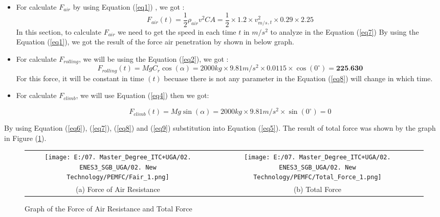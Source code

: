 \documentclass[12pt,a4paper]{article}
\numberwithin{equation}{section}
\begin{document}
	\begin{itemize}[label=-]
		\item For calculate $F_{air}$ by using Equation (\ref{eq1}) , we got :
			\begin{equation}




				F_{air}(t) = \frac{1}{2}\rho_{air}v^2CA = \frac{1}{2}\times1.2\times 	v^2_{m/s}_{,t}\times0.29\times 		2.25 \label{eq7}
			\end{equation}
			In this section, to calculate $F_{air}$ we need to get the speed in each time $t$ in $m/s^2$ to analyze in the Equation (\ref{eq7})
			By using the Equation (\ref{eq1}), we got the result of the force air penetration by shown in below graph.
		\item For calculate $F_{rolling}$, we will be using the Equation (\ref{eq2}), we got :
			\begin{equation}
				F_{rolling}(t) = MgC_r\cos(\alpha) = 2000kg\times9.81m/s^2\times0.0115\times\cos(0^\circ) = \textbf{225.630} \label{eq8}
			\end{equation}
			For this force, it will be constant in time $(t)$ becuase there is not any parameter in the Equation (\ref{eq8}) will change in which time.
			
			
		\item For calculate $F_{climb}$, we will use Equation (\ref{eq4}) then we got:
		
			\begin{equation}
				F_{climb}(t) = Mg\sin(\alpha) = 2000kg \times 9.81m/s^2 \times \sin(0^\circ) = 0 \label{eq9}
			\end{equation}		
	\end{itemize}

	By using Equation (\ref{eq6}), (\ref{eq7}), (\ref{eq8}) and (\ref{eq9}) substitution into Equation (\ref{eq5}). The result of total force was shown by the graph in Figure (\ref{4}).
	
	\begin{figure}[htbp]
		\centering
		\begin{tabular}{c @{\qquad} c}
			\texttt{[image: E:/07. Master\_Degree\_ITC+UGA/02. ENES3\_SGB\_UGA/02. New Technology/PEMFC/Fair\_1.png]} &
			\texttt{[image: E:/07. Master\_Degree\_ITC+UGA/02. ENES3\_SGB\_UGA/02. New Technology/PEMFC/Total\_Force\_1.png]} \\
			
			\small (a) Force of Air Resistance & \small (b) Total Force
		\end{tabular}
		
		\caption{\small Graph of the  Force of Air Resistance and Total Force}
		\label{4}
	\end{figure}
		
\end{document}
